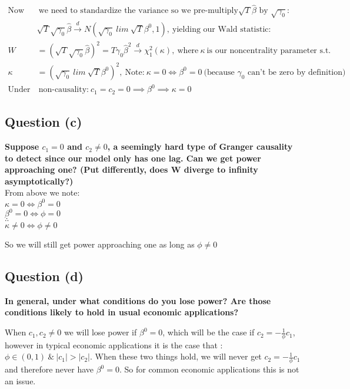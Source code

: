 \documentclass[11pt]{article}
\theoremstyle{definition}
\def\indist{\stackrel{d}{\rightarrow}}
\begin{document}
\begin{equation*}
\begin{split}
\text{Now} & \ \text{we need to standardize the variance so we pre-multiply$\sqrt{T}\hat{\beta}$ by $\sqrt{\gamma_{0}}$:} \\
 & \sqrt{T}\sqrt{\gamma_{0}}\hat{\beta} \indist N(\sqrt{\gamma_{0}} \ lim \ \sqrt{T}\beta^{0}, 1), \ \text{yielding our Wald statistic:} \\
W & =\left(\sqrt{T}\sqrt{\gamma_{0}}\hat{\beta}\right)^2 = T\gamma_{0}\hat{\beta}^{2} \indist \chi_{1}^{2}(\kappa), \ \text{where} \ \kappa \  \text{is our noncentrality parameter s.t.} \\
\kappa & =(\sqrt{\gamma_{0}} \ lim \ \sqrt{T} \beta^{0})^{2}, \ \text{Note:} \ \kappa=0 \iff \beta^{0}=0 \ \text{(because $\gamma_{0}$ can't be zero by definition)}\\
\text{Under} & \ \text{non-causality:} \  c_{1}=c_{2}=0 \implies \beta^{0} \implies \kappa=0
\end{split}
\end{equation*}

\subsection{Question (c)}
\textbf{Suppose $c_{1}=0$ and $c_{2}\neq0$, a seemingly hard type of Granger causality to detect since our model only has one lag.  Can we get power approaching one? (Put differently, does W diverge to infinity asymptotically?)}\\

\noindent
From above we note: \\

$\kappa=0 \iff \beta^{0}=0$ \\ 
\indent
$\beta^{0}=0 \iff \phi=0$ \\
\indent
$\therefore$ \\
\indent
$\kappa \neq 0 \iff \phi \neq 0$

\noindent
So we will still get power approaching one as long as $\phi \neq 0$

\subsection{Question (d)}
\textbf{In general, under what conditions do you lose power? Are those conditions likely to hold in usual economic applications?}

When $c_{1},c_{2}\neq0$ we will lose power if $\beta^{0}=0$, which will be the case if $c_{2}=-\frac{1}{\phi}c_{1}$, however in typical economic applications it is the case that : $\phi \in (0,1) \ \& \ |c_{1}|>|c_{2}|$.  When these two things hold, we will never get $c_{2}=-\frac{1}{\phi}c_{1}$ and therefore never have $\beta^{0}=0$.  So for common economic applications this is not an issue.
\end{document}
